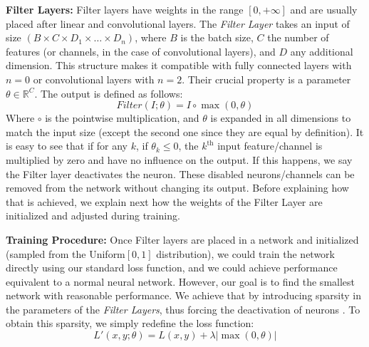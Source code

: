 \textbf{Filter Layers: } Filter layers have weights in the range $[0,+\infty]$ and are usually placed after
linear and convolutional layers.
The \textit{Filter Layer} takes an input of size $\left(B \times C \times D_1
  \times \dots \times D_n\right)$, where $B$ is the batch size, $C$ the number
of features (or channels, in the case of convolutional layers), and $D$ any
additional dimension. This structure makes it compatible with fully connected
layers with $n=0$ or convolutional layers with $n=2$. Their crucial property is
a parameter $\theta \in \mathbb{R}^C$. The output is defined as follows: \vspace{-1em}
\begin{equation} Filter(I;\theta) = I \circ \max(0, \theta) \end{equation}
Where $\circ$ is the pointwise multiplication, and $\theta$ is expanded in all
dimensions to match the input size (except the second one since they are equal
by definition). It is easy to see that if for any $k$, if $\theta_k \leq 0$,
the $k^{\text{th}}$ input feature/channel is multiplied by zero and have no
influence on the output. If this happens, we say the Filter layer deactivates
the neuron. These disabled neurons/channels can be removed from the network
without changing its output. Before explaining how that is achieved, we explain
next how the weights of the Filter Layer are initialized and adjusted during
training.

\textbf{Training Procedure: } Once Filter layers are placed in a network and initialized (sampled from the Uniform$[0, 1]$ distribution),
we could train the network directly using our standard loss function, and we could achieve performance equivalent to a normal neural
network. However, our goal is to find the smallest network with reasonable
performance. We achieve that by introducing sparsity in the parameters of the
\textit{Filter Layers}, thus forcing the deactivation of neurons%
. To obtain this sparsity, we simply redefine the loss function:
\vspace{-.5em}
\begin{equation}
  L'(x,y;\theta) = L(x, y) + \lambda|\max(0, \theta)|
\end{equation}

